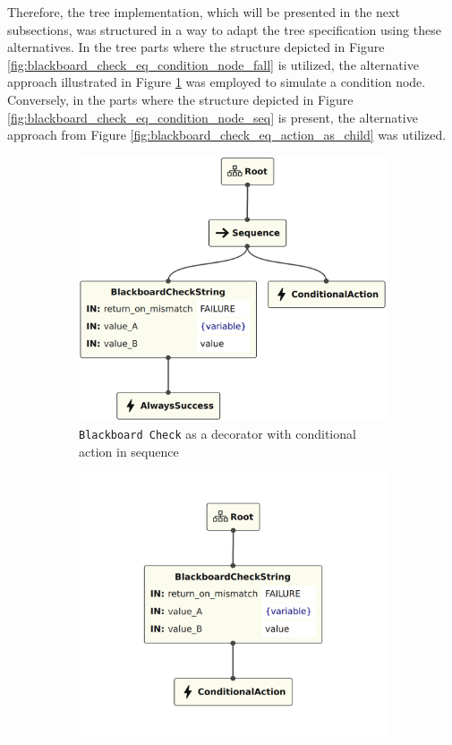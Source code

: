 Therefore, the tree implementation, which will be presented in the next subsections, was structured in a way to adapt the tree specification using these alternatives. In the tree parts where the structure depicted in Figure \ref{fig:blackboard_check_eq_condition_node_fall} is utilized, the alternative approach illustrated in Figure \ref{fig:blackboard_check_eq_action_in_sequence} was employed to simulate a condition node. Conversely, in the parts where the structure depicted in Figure \ref{fig:blackboard_check_eq_condition_node_seq} is present, the alternative approach from Figure \ref{fig:blackboard_check_eq_action_as_child} was utilized.

\begin{figure}[!h]
    \centering
    \begin{subfigure}[b]{.49\linewidth}
        \centering
        \includegraphics[width=0.85\linewidth]{images/implementation/BlackboardCheck - Equivalence 1.png}
        \caption{\texttt{Blackboard Check} as a decorator with conditional action in sequence}
        \label{fig:blackboard_check_eq_action_in_sequence}
    \end{subfigure}
    \hfill
    \begin{subfigure}[b]{.49\linewidth}
        \centering
        \includegraphics[width=0.85\linewidth]{images/implementation/BlackboardCheck - Equivalence 2.png}

\end{subfigure}
\end{figure}

